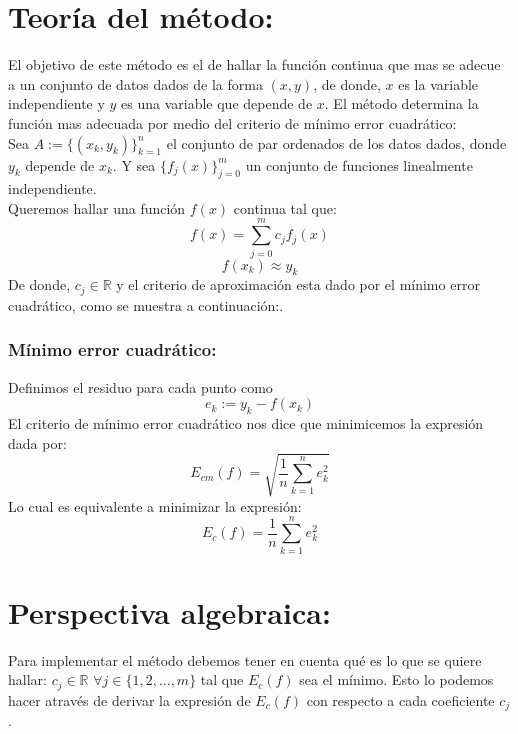 \section{Teoría del método:}
El objetivo de este método es el de hallar la función continua que mas se adecue a un conjunto de datos dados de la forma $(x,y)$, de donde, $x$ es la variable independiente y $y$ es una variable que depende de $x$. El método determina la función mas adecuada por medio del criterio de mínimo error cuadrático:\\

Sea $A:=\{(x_k,y_k)\}_{k=1}^n$ el conjunto de par ordenados de los datos dados, donde $y_k$ depende de $x_k$. Y sea $\{f_j(x)\}_{j=0}^m$ un conjunto de funciones linealmente independiente.\\

Queremos hallar una función $f(x)$ continua tal que:
$$f(x)=\sum_{j=0}^mc_jf_j(x)$$
$$f(x_k)\approx y_k$$
De donde, $c_j\in\mathbb{R}$ y el criterio de aproximación esta dado por el mínimo error cuadrático, como se muestra a continuación:.\\

\subsubsection{Mínimo error cuadrático:}
Definimos el residuo para cada punto como $$e_k:=y_k-f(x_k)$$
El criterio de mínimo error cuadrático nos dice que minimicemos la expresión dada por: $$E_{cm}(f)=\sqrt{\frac{1}{n}\sum_{k=1}^ne_k^2}$$
Lo cual es equivalente a minimizar la expresión:
$$E_c(f)=\frac{1}{n}\sum_{k=1}^ne_k^2$$
\section{Perspectiva algebraica:}
Para implementar el método debemos tener en cuenta qué es lo que se quiere hallar:  $c_j\in\mathbb{R}$ $\forall j\in\{1,2,...,m\}$ tal que $E_c(f)$ sea el mínimo. Esto lo podemos hacer através de derivar la expresión de $E_c(f)$ con respecto a cada coeficiente $c_j$.\\

